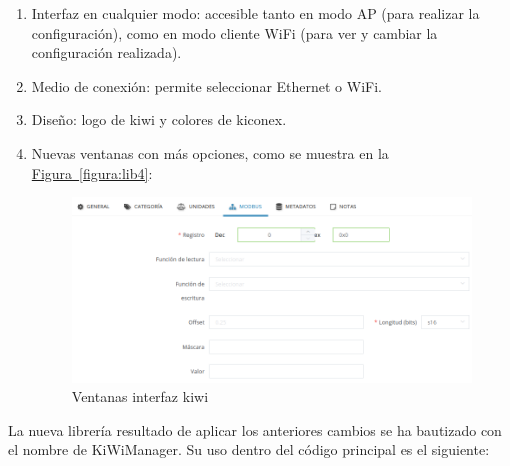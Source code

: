 \begin{enumerate}
  \item Interfaz en cualquier modo: accesible tanto en modo AP (para realizar la configuración), como en modo cliente WiFi (para ver y cambiar la configuración realizada).
  \item Medio de conexión: permite seleccionar Ethernet o WiFi.
  \item Diseño: logo de kiwi y colores de kiconex.
  \item Nuevas ventanas con más opciones, como se muestra en la \hyperref[figura:lib5]{Figura~\ref{figura:lib4}}:

  \begin{figure}[H]
    \centering
    \includegraphics[width=\textwidth, keepaspectratio]{img/lib3}
    \caption{Ventanas interfaz kiwi}
    \label{figura:lib5}
  \end{figure}
\end{enumerate}

La nueva librería resultado de aplicar los anteriores cambios se ha bautizado con el nombre de KiWiManager. Su uso dentro del código principal es el siguiente:

